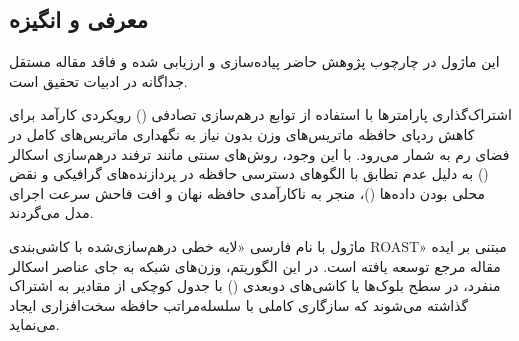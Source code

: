 \subsection{معرفی و انگیزه}
این ماژول در چارچوب پژوهش حاضر پیاده‌سازی و ارزیابی شده و فاقد مقاله مستقل جداگانه در ادبیات تحقیق است.

اشتراک‌گذاری پارامترها با استفاده از توابع درهم‌سازی تصادفی () رویکردی کارآمد برای کاهش ردپای حافظه ماتریس‌های وزن بدون نیاز به نگهداری ماتریس‌های کامل در فضای رم به شمار می‌رود. با این وجود، روش‌های سنتی مانند ترفند درهم‌سازی اسکالر () به دلیل عدم تطابق با الگوهای دسترسی حافظه در پردازنده‌های گرافیکی و نقض محلی بودن داده‌ها ()، منجر به ناکارآمدی حافظه نهان و افت فاحش سرعت اجرای مدل می‌گردند.

ماژول  با نام فارسی «لایه خطی درهم‌سازی‌شده با کاشی‌بندی ROAST» مبتنی بر ایده مقاله مرجع  توسعه یافته است. در این الگوریتم، وزن‌های شبکه به جای عناصر اسکالر منفرد، در سطح بلوک‌ها یا کاشی‌های دوبعدی () با جدول کوچکی از مقادیر به اشتراک گذاشته می‌شوند که سازگاری کاملی با سلسله‌مراتب حافظه سخت‌افزاری ایجاد می‌نماید.
